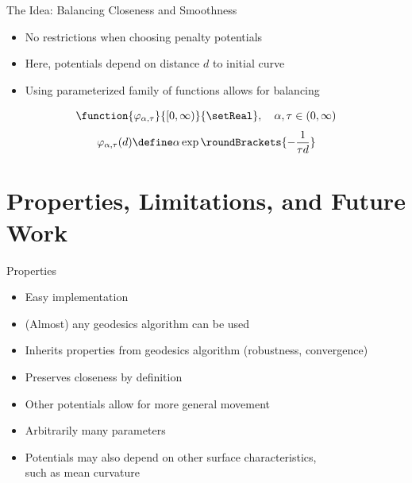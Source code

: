 \documentclass[aspectratio=169,fleqn]{beamer}
\begin{document}
\begin{frame}{The Idea: Balancing Closeness and Smoothness}
\begin{minipage}[c]{0.45\linewidth}
    \end{minipage}
    \hfill
    \begin{minipage}[c]{0.45\linewidth}
      \pause
      \begin{itemize}
        \item<+-> No restrictions when choosing penalty potentials
        \item<+-> Here, potentials depend on distance $d$ to initial curve
        \item<+-> Using parameterized family of functions allows for balancing
      \end{itemize}

      \pause
      \[
        \function{\varphi_{\alpha,\tau}}{[0,\infty)}{\setReal},\quad \alpha,\tau\in(0,\infty)
      \]
      \[
        \varphi_{\alpha,\tau}(d) \define \alpha\exp\roundBrackets{-\frac{1}{\tau d}}
      \]
    \end{minipage}
  \end{frame}

\section{Properties, Limitations, and Future Work}
  \begin{frame}{Properties}
    \pause
    \begin{itemize}
      \item<+-> Easy implementation
      \item<+-> (Almost) any geodesics algorithm can be used
      \item<+-> Inherits properties from geodesics algorithm (robustness, convergence)
      \item<+-> Preserves closeness by definition
      \item<+-> Other potentials allow for more general movement
      \item<+-> Arbitrarily many parameters
      \item<+-> Potentials may also depend on other surface characteristics, \\ such as mean curvature
    \end{itemize}
  \end{frame}
\end{document}
